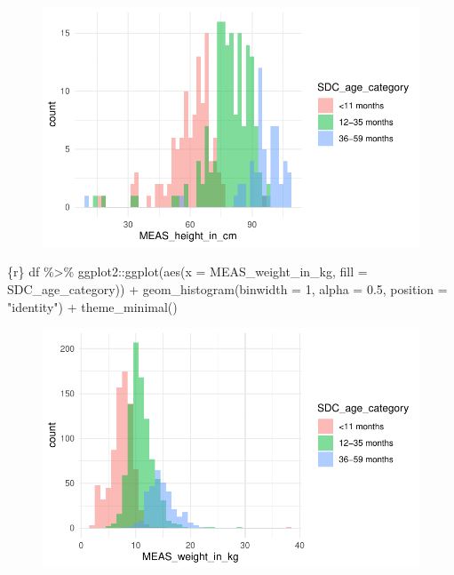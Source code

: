 \documentclass[
  letterpaper,
  DIV=11,
  numbers=noendperiod,
  oneside]{scrreprt}
\newenvironment{Shaded}{\begin{snugshade}}{\end{snugshade}}
\newcommand{\AttributeTok}[1]{\textcolor[rgb]{0.40,0.45,0.13}{#1}}
\newcommand{\DecValTok}[1]{\textcolor[rgb]{0.68,0.00,0.00}{#1}}
\newcommand{\FloatTok}[1]{\textcolor[rgb]{0.68,0.00,0.00}{#1}}
\newcommand{\FunctionTok}[1]{\textcolor[rgb]{0.28,0.35,0.67}{#1}}
\newcommand{\InformationTok}[1]{\textcolor[rgb]{0.37,0.37,0.37}{#1}}
\newcommand{\NormalTok}[1]{\textcolor[rgb]{0.00,0.23,0.31}{#1}}
\newcommand{\SpecialCharTok}[1]{\textcolor[rgb]{0.37,0.37,0.37}{#1}}
\newcommand{\StringTok}[1]{\textcolor[rgb]{0.13,0.47,0.30}{#1}}
\begin{document}
\begin{figure}[H]

{\centering \includegraphics{ds4ph_day3_session01_practical_session_files/figure-pdf/unnamed-chunk-13-1.pdf}

}

\end{figure}

\begin{Shaded}
\begin{Highlighting}[]
\InformationTok{\textasciigrave{}\textasciigrave{}\textasciigrave{}\{r\}}
\NormalTok{df }\SpecialCharTok{\%\textgreater{}\%}\NormalTok{  ggplot2}\SpecialCharTok{::}\FunctionTok{ggplot}\NormalTok{(}\FunctionTok{aes}\NormalTok{(}\AttributeTok{x =}\NormalTok{ MEAS\_weight\_in\_kg,}
                            \AttributeTok{fill =}\NormalTok{ SDC\_age\_category)) }\SpecialCharTok{+}
  \FunctionTok{geom\_histogram}\NormalTok{(}\AttributeTok{binwidth =} \DecValTok{1}\NormalTok{, }\AttributeTok{alpha =} \FloatTok{0.5}\NormalTok{, }\AttributeTok{position =} \StringTok{"identity"}\NormalTok{) }\SpecialCharTok{+}
  \FunctionTok{theme\_minimal}\NormalTok{()}
\InformationTok{\textasciigrave{}\textasciigrave{}\textasciigrave{}}
\end{Highlighting}
\end{Shaded}

\begin{figure}[H]

{\centering \includegraphics{ds4ph_day3_session01_practical_session_files/figure-pdf/unnamed-chunk-14-1.pdf}

}

\end{figure}
\end{document}
